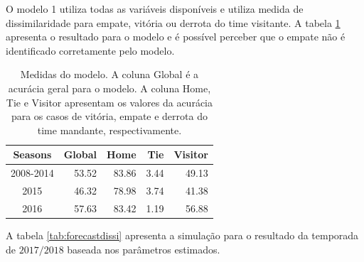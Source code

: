 \documentclass[review]{elsarticle}
\begin{document}
O modelo 1 utiliza todas as variáveis disponíveis e utiliza medida de dissimilaridade para empate, vitória ou derrota do time visitante. A tabela \ref{tab:medidasmod} apresenta o resultado para o modelo e é possível perceber que o empate não é identificado corretamente pelo modelo.

\begin{table}[!h]
\centering
\scriptsize
\begin{tabular}{crrrr}
  \hline
Seasons & Global & Home & Tie & Visitor \\ 
  \hline
2008-2014 & 53.52 & 83.86 & 3.44 & 49.13 \\ 
  2015 & 46.32 & 78.98 & 3.74 & 41.38 \\ 
  2016 & 57.63 & 83.42 & 1.19 & 56.88 \\ 
   \hline
\end{tabular}
    \caption[\scriptsize{Medidas do modelo.}]{\scriptsize{Medidas do modelo. A coluna Global é a acurácia geral para o modelo. A coluna Home, Tie e Visitor apresentam os valores da acurácia para os casos de vitória, empate e derrota do time mandante, respectivamente.}}
    \label{tab:medidasmod}
\end{table}


A tabela \ref{tab:forecastdissi} apresenta a simulação para o resultado da temporada de $2017/2018$ baseada nos parâmetros estimados.
\end{document}
